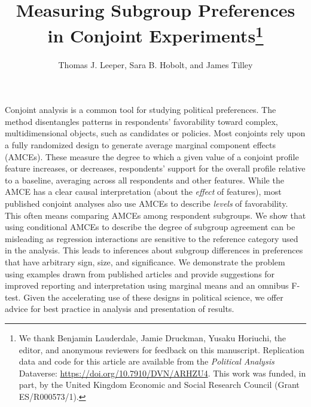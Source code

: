 \documentclass[a4paper,12pt]{article}\usepackage[]{graphicx}\usepackage[]{color}
\title{Measuring Subgroup Preferences in Conjoint Experiments\footnote{We thank Benjamin Lauderdale, Jamie Druckman, Yusaku Horiuchi, the editor, and anonymous reviewers for feedback on this manuscript. Replication data and code for this article are available from the \textit{Political Analysis} Dataverse: \url{https://doi.org/10.7910/DVN/ARHZU4}. This work was funded, in part, by the United Kingdom Economic and Social Research Council (Grant ES/R000573/1).}
}
\author{Thomas J. Leeper, Sara B. Hobolt, and James Tilley}
\begin{document}
\maketitle

{\abstract Conjoint analysis is a common tool for studying political preferences. The method disentangles patterns in respondents' favorability toward complex, multidimensional objects, such as candidates or policies. Most conjoints rely upon a fully randomized design to generate average marginal component effects (AMCEs). These measure the degree to which a given value of a conjoint profile feature increases, or decreases, respondents' support for the overall profile relative to a baseline, averaging across all respondents and other features. While the AMCE has a clear causal interpretation (about the \textit{effect} of features), most published conjoint analyses also use AMCEs to describe \textit{levels} of favorability. This often means comparing AMCEs among respondent subgroups. We show that using conditional AMCEs to describe the degree of subgroup agreement can be misleading as regression interactions are sensitive to the reference category used in the analysis. This leads to inferences about subgroup differences in preferences that have arbitrary sign, size, and significance. We demonstrate the problem using examples drawn from published articles and provide suggestions for improved reporting and interpretation using marginal means and an omnibus F-test. Given the accelerating use of these designs in political science, we offer advice for best practice in analysis and presentation of results.}














\clearpage
\doublespacing
\end{document}
